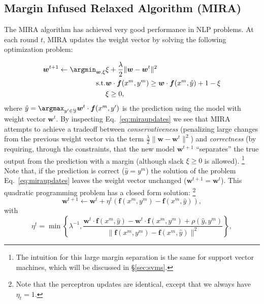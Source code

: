 \subsection{Margin Infused Relaxed Algorithm (MIRA)}

The MIRA algorithm \citep{Crammer2002,Crammer2006}  has achieved very good performance in NLP problems. 
At each round $t$, MIRA updates the weight vector by solving the following optimization problem: 

\begin{eqnarray}\label{eq:miraupdates} 
\boldsymbol{w}^{t+1} \leftarrow \argmin_{\boldsymbol{w}, \xi} & \xi  + \frac{\lambda}{2} \|\boldsymbol{w} - \boldsymbol{w}^t\|^2 \\
\text{s.t.} & \boldsymbol{w} \cdot \boldsymbol{f}(x^m,y^m) \ge \boldsymbol{w} \cdot\boldsymbol{f}(x^m,\hat{y}) + 1 - \xi\\
& \xi \ge 0,
\end{eqnarray} 
where $\hat{y}=\argmax_{y'\in\mathcal{Y}} \boldsymbol{w}^t \cdot \boldsymbol{f}(x^m,y')$ is the prediction using the model with weight vector 
$\boldsymbol{w}^t$. By inspecting Eq.~\ref{eq:miraupdates} we see that MIRA attempts to achieve a tradeoff between \emph{conservativeness} 
(penalizing large changes from the previous weight vector via the term $\frac{\lambda}{2} \|\boldsymbol{w} - \boldsymbol{w}^t\|^2$) 
and \emph{correctness} (by requiring, through the constraints, that the new model  $\boldsymbol{w}^{t+1}$ ``separates'' the true output 
from the prediction with a margin (although slack $\xi \ge 0$ is allowed).%
\footnote{The intuition for this large margin separation is the same for support vector machines, which will be discussed in \S\ref{sec:svms}.} %
Note that, if the prediction is correct ($\hat{y}=y^m$) the solution of the problem 
Eq.~\ref{eq:miraupdates} leaves the weight vector unchanged ($\boldsymbol{w}^{t+1}=\boldsymbol{w}^t$). 
This quadratic programming problem has a closed form solution:%
\footnote{Note that the perceptron updates are identical, except that we always have $\eta_t=1$.} %
$$\boldsymbol{w}^{t+1} \leftarrow  \boldsymbol{w}^{t} + \eta^t  (\boldsymbol{f}(x^m,y^m) - \boldsymbol{f}(x^m,\hat{y})),$$ 
with $$\eta^t = \min\left\{\lambda^{-1}, \frac{\boldsymbol{w}^t \cdot \boldsymbol{f}(x^m,\hat{y}) - 
\boldsymbol{w}^t \cdot \boldsymbol{f}(x^m,y^m) + \rho(\hat{y},y^m)}{\|\boldsymbol{f}(x^m,y^m) - \boldsymbol{f}(x^m,\hat{y})\|^2}\right\},$$

